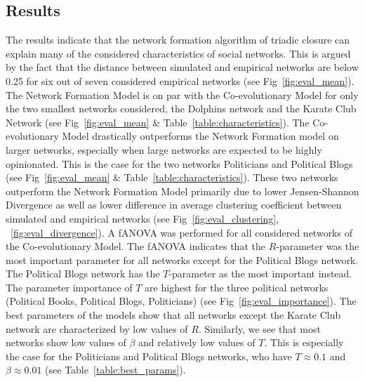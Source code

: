\documentclass{article}
\begin{document}
\subsection{Results}

The results indicate that the network formation algorithm of triadic closure can explain many of the considered characteristics of social networks. This is argued by the fact that the distance between simulated and empirical networks are below 0.25 for six out of seven considered empirical networks (see Fig~\ref{fig:eval_mean}). The Network Formation Model is on par with the Co-evolutionary Model for only the two smallest networks considered, the Dolphins network and the Karate Club Network (see Fig~\ref{fig:eval_mean} \& Table~\ref{table:characteristics}). The Co-evolutionary Model drastically outperforms the Network Formation model on larger networks, especially when large networks are expected to be highly opinionated. This is the case for the two networks Politicians and Political Blogs (see Fig~\ref{fig:eval_mean} \& Table~\ref{table:characteristics}). These two networks outperform the Network Formation Model primarily due to lower Jensen-Shannon Divergence as well as lower difference in average clustering coefficient between simulated and empirical networks (see Fig~\ref{fig:eval_clustering}, ~\ref{fig:eval_divergence}).  
A fANOVA was performed for all considered networks of the Co-evolutionary Model. The fANOVA indicates that the $R$-parameter was the most important parameter for all networks except for the Political Blogs network. The Political Blogs network has the $T$-parameter as the most important instead. The parameter importance of $T$ are highest for the three political networks (Political Books, Political Blogs, Politicians) (see Fig~\ref{fig:eval_importance}).
The best parameters of the models show that all networks except the Karate Club network are characterized by low values of $R$. Similarly, we see that most networks show low values of $\beta$ and relatively low values of $T$. This is especially the case for the Politicians and Political Blogs networks, who have $T \approx 0.1$ and $\beta \approx 0.01$ (see Table~\ref{table:best_params}).  
\end{document}
